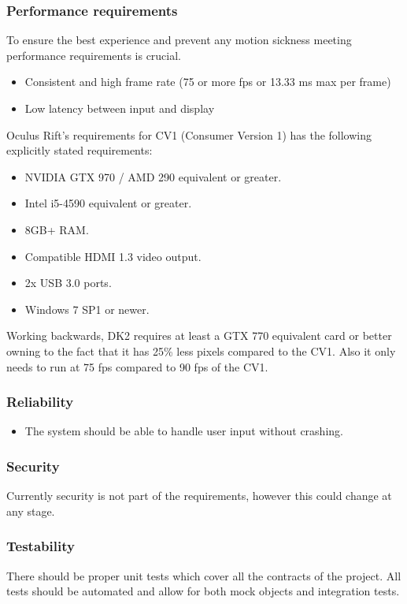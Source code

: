 \documentclass[a4paper,12pt]{article}
\begin{document}
\subsubsection{Performance requirements}
To ensure the best experience and prevent any motion sickness meeting performance requirements is crucial.
	\begin{itemize}
		\item Consistent and high frame rate (75 or more fps or 13.33 ms max per frame)
		\item Low latency between input and display
	\end{itemize}
Oculus Rift's requirements for CV1 (Consumer Version 1) has the following explicitly stated requirements:
\begin{itemize}
	\item NVIDIA GTX 970 / AMD 290 equivalent or greater.
	\item Intel i5-4590 equivalent or greater.
	\item 8GB+ RAM.
	\item Compatible HDMI 1.3 video output.
	\item 2x USB 3.0 ports.
	\item Windows 7 SP1 or newer.
\end{itemize}
Working backwards, DK2 requires at least a GTX 770 equivalent card or better owning to the fact that it has 25\% less pixels compared to the CV1. Also it only needs to run at 75 fps compared to 90 fps of the CV1.
\subsubsection{Reliability}
	\begin{itemize}
		\item The system should be able to handle user input without crashing.
	\end{itemize}

\subsubsection{Security}
Currently security is not part of the requirements, however this could change at any stage.



\subsubsection{Testability}
There should be proper unit tests which cover all the contracts of the project. All tests should be automated and allow for both mock objects and integration tests.
\end{document}
